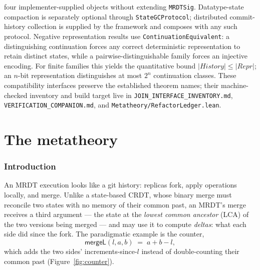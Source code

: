 \documentclass[11pt]{article}
\let\salInlinePart\part
\renewcommand{\part}{\clearpage\salInlinePart}
\newcommand{\mergeL}{\mathsf{mergeL}}
\newcommand{\lean}[1]{\texttt{#1}}
\begin{document}
four implementer-supplied objects without extending \lean{MRDTSig}.
Datatype-state compaction is separately optional through
\lean{StateGCProtocol}; distributed commit-history collection is supplied by
the framework and composes with any such protocol.
Negative representation results use
\lean{ContinuationEquivalent}: a distinguishing continuation forces any
correct deterministic representation to retain distinct states, while a
pairwise-distinguishable family forces an injective encoding.  For finite
families this yields the quantitative bound
$|\mathit{History}| \leq |\mathit{Repr}|$; an $n$-bit representation
distinguishes at most $2^n$ continuation classes. These
compatibility interfaces preserve the established theorem names; their
machine-checked inventory and build target live in
\lean{JOIN\_INTERFACE\_INVENTORY.md},
\lean{VERIFICATION\_COMPANION.md}, and
\lean{Metatheory/RefactorLedger.lean}.
\fi\fi

\ifdefined\salPaperB\else
\part{The metatheory}

\section{Introduction}

An MRDT execution looks like a git history: replicas fork, apply
operations locally, and merge. Unlike a state-based CRDT, whose binary
merge must reconcile two states with no memory of their common past, an
MRDT's merge receives a third argument --- the state at the \emph{lowest
common ancestor} (LCA) of the two versions being merged --- and may use it
to compute \emph{deltas}: what each side did since the fork. The
paradigmatic example is the counter,
\[
  \mergeL(l,a,b) \;=\; a + b - l,
\]
which adds the two sides' increments-since-$l$ instead of double-counting
their common past (Figure~\ref{fig:counter}).
\end{document}
